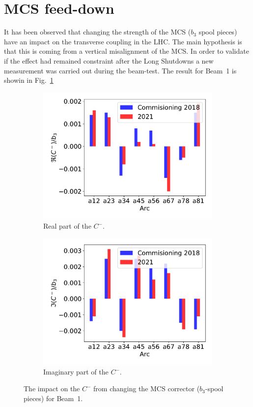 \documentclass[a4paper]{cernatsnote}
\begin{document}
\section{MCS feed-down}
It has been observed that changing the strength of the MCS ($b_3$ spool pieces) have an impact on the transverse coupling in the LHC. The main hypothesis is that this is coming from a vertical misalignment of the MCS. In order to validate if the effect had remained constraint after the Long Shutdowns a new measurement was carried out during the beam-test. The result for Beam~1 is showin in Fig.~\ref{}

\begin{figure}[ht]
\begin{subfigure}{.5\textwidth}
  \centering
  \includegraphics[width=.8\linewidth]{plots/MCS/b_1change_re_per_b3.pdf}  
  \caption{Real part of the $C^-$.}
\end{subfigure}
\begin{subfigure}{.5\textwidth}
  \centering
  \includegraphics[width=.8\linewidth]{plots/MCS/b_1change_im_per_b3.pdf}  
  \caption{Imaginary part of the $C^-$.}
\end{subfigure}
\caption{The impact on the $C^-$ from changing the MCS corrector ($b_3$-spool pieces) for Beam~1. }
\label{fig:beam1_mcs}
\end{figure}
\end{document}
